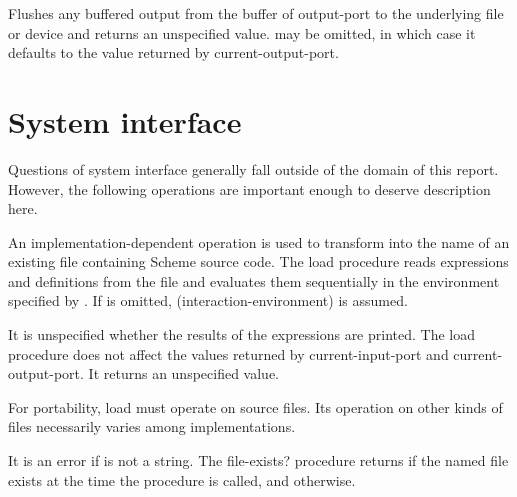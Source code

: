 \begin{entry}{%
}

Flushes any buffered output from the buffer of output-port to the
underlying file or device and returns an unspecified value.
 may be omitted, in which case it defaults to
the value returned by {\cf current-output-port}.

\end{entry}


\section{System interface}

Questions of system interface generally fall outside of the domain of this
report.  However, the following operations are important enough to
deserve description here.


\begin{entry}{%
}

An implementation-dependent operation is used to transform
 into the name of an existing file
containing Scheme source code.  The {\cf load} procedure reads
expressions and definitions from the file and evaluates them
sequentially in the environment specified by .
If  is omitted, {\cf (interaction-environment)}
is assumed.

It is unspecified whether the results of the expressions
are printed.  The {\cf load} procedure does not affect the values
returned by {\cf current-input-port} and {\cf current-output-port}.
It returns an unspecified value.


\begin{rationale}
For portability, {\cf load} must operate on source files.
Its operation on other kinds of files necessarily varies among
implementations.
\end{rationale}
\end{entry}

\begin{entry}{%
}

It is an error if  is not a string. The {\cf file-exists?} procedure returns
\schtrue{} if the named file exists at the time the procedure is called,
and \schfalse{} otherwise.

\end{entry}

